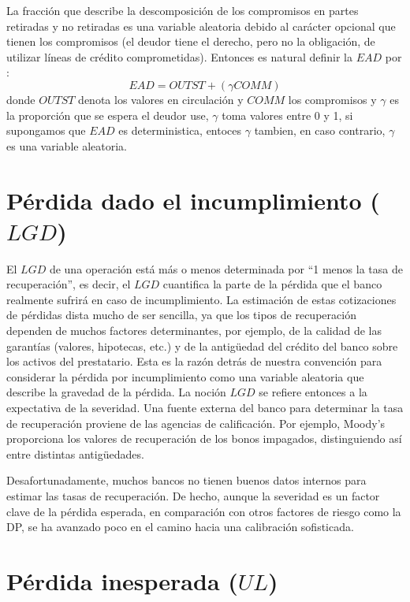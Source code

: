 \documentclass[
  12pt,
]{krantz}
\theoremstyle{definition}
\theoremstyle{definition}
\theoremstyle{definition}
\theoremstyle{remark}
\begin{document}
La fracción que describe la descomposición de los compromisos en partes retiradas y no retiradas es una variable aleatoria debido al carácter opcional que tienen los compromisos (el deudor tiene el derecho, pero no la obligación, de utilizar líneas de crédito comprometidas). Entonces es natural definir la \(EAD\) por : \[EAD=OUTST+(\gamma  COMM)\] donde \(OUTST\) denota los valores en circulación y \(COMM\) los compromisos y \(\gamma\) es la proporción que se espera el deudor use, \(\gamma\) toma valores entre 0 y 1, si supongamos que \(EAD\) es deterministica, entoces \(\gamma\) tambien, en caso contrario, \(\gamma\) es una variable aleatoria.

\hypertarget{perdida-dado-el-incumplimiento-lgd}{%
\section{\texorpdfstring{Pérdida dado el incumplimiento (\(LGD\))}{Pérdida dado el incumplimiento (LGD)}}\label{perdida-dado-el-incumplimiento-lgd}}

El \(LGD\) de una operación está más o menos determinada por ``1 menos la tasa de recuperación'', es decir, el \(LGD\) cuantifica la parte de la pérdida que el banco realmente sufrirá en caso de incumplimiento. La estimación de estas cotizaciones de pérdidas dista mucho de ser sencilla, ya que los tipos de recuperación dependen de muchos factores determinantes, por ejemplo, de la calidad de las garantías (valores, hipotecas, etc.) y de la antigüedad del crédito del banco sobre los activos del prestatario. Esta es la razón detrás de nuestra convención para considerar la pérdida por incumplimiento como una variable aleatoria que describe la gravedad de la pérdida. La noción \(LGD\) se refiere entonces a la expectativa de la severidad. Una fuente externa del banco para determinar la tasa de recuperación proviene de las agencias de calificación. Por ejemplo, Moody's proporciona los valores de recuperación de los bonos impagados, distinguiendo así entre distintas antigüedades.

Desafortunadamente, muchos bancos no tienen buenos datos internos para estimar las tasas de recuperación. De hecho, aunque la severidad es un factor clave de la pérdida esperada, en comparación con otros factores de riesgo como la DP, se ha avanzado poco en el camino hacia una calibración sofisticada.

\hypertarget{perdida-inesperada-ul}{%
\section{\texorpdfstring{Pérdida inesperada (\(UL\))}{Pérdida inesperada (UL)}}\label{perdida-inesperada-ul}}
\end{document}
